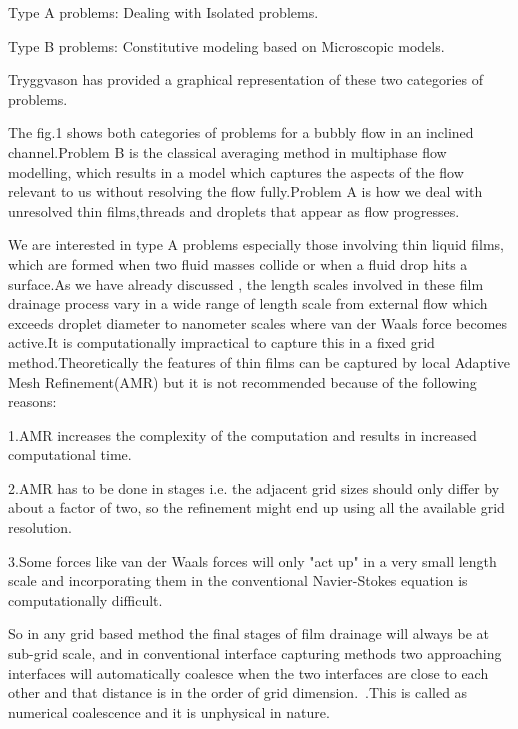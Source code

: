 \documentclass[
manuscript=article]{achemso}
\begin{document}
Type A problems: Dealing with Isolated problems.

Type B problems: Constitutive modeling based on Microscopic models.

Tryggvason has provided a graphical representation of these two categories of problems.

The fig.1 shows both categories of problems for a bubbly flow in an inclined channel.Problem B is the classical averaging method in multiphase flow modelling, which results in a model which captures the aspects of the flow relevant to us without resolving the flow fully.Problem A is how we deal with unresolved thin films,threads and droplets that appear as flow progresses.

We are interested in type A problems especially those involving thin liquid films, which are formed when two fluid masses collide or when a fluid drop hits a surface.As we have already discussed , the length scales involved in these film drainage process vary in a wide range of length scale from external flow which exceeds droplet diameter to nanometer scales where van der Waals force becomes active.It is computationally impractical to capture this in a fixed grid method.Theoretically the features of thin films can be captured by local Adaptive Mesh Refinement(AMR) but it is not recommended because of the following reasons:

1.AMR increases the complexity of the computation and results in increased computational time.

2.AMR has to be done in stages i.e. the adjacent grid sizes should only differ by about a factor of two, so the refinement might end up using all the available grid resolution.

3.Some forces like van der Waals forces will only "act up" in a very small length scale and incorporating them in the conventional Navier-Stokes equation is computationally difficult.

So in any grid based method the final stages of film drainage will always be at sub-grid scale, and in conventional interface capturing methods two approaching interfaces will automatically coalesce when the two interfaces are close to each other and that distance is in the order of grid dimension.~\cite{3}.This is called as numerical coalescence and it is unphysical in nature.
\end{document}

